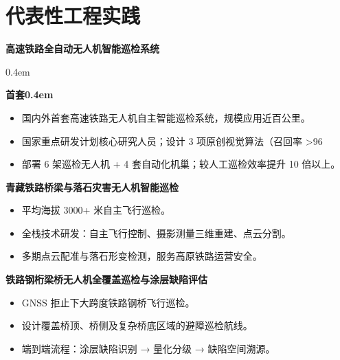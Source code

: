 \documentclass[10.5pt,a4paper]{ctexart}
\newcommand{\ambpill}[1]{\colorbox{amber}{\kern0.4em\strut\footnotesize\sffamily\bfseries\color{white}#1\kern0.4em}}
\begin{document}
\section{代表性工程实践}
\noindent\textbf{高速铁路全自动无人机智能巡检系统}\hspace{0.6em}\ambpill{首套}\par\vspace{0.2em}
\begin{itemize}[leftmargin=1.1em,label=\textcolor{amber}{$\bullet$},itemsep=1.5pt]
  \item 国内外首套高速铁路无人机自主智能巡检系统，规模应用近百公里。
  \item 国家重点研发计划核心研究人员；设计 3 项原创视觉算法（召回率 >96%
  \item 部署 6 架巡检无人机 + 4 套自动化机巢；较人工巡检效率提升 10 倍以上。
\end{itemize}
\vspace{0.5em}
\noindent\textbf{青藏铁路桥梁与落石灾害无人机智能巡检}\par\vspace{0.2em}
\begin{itemize}[leftmargin=1.1em,label=\textcolor{amber}{$\bullet$},itemsep=1.5pt]
  \item 平均海拔 3000+ 米自主飞行巡检。
  \item 全栈技术研发：自主飞行控制、摄影测量三维重建、点云分割。
  \item 多期点云配准与落石形变检测，服务高原铁路运营安全。
\end{itemize}
\vspace{0.5em}
\noindent\textbf{铁路钢桁梁桥无人机全覆盖巡检与涂层缺陷评估}\par\vspace{0.2em}
\begin{itemize}[leftmargin=1.1em,label=\textcolor{amber}{$\bullet$},itemsep=1.5pt]
  \item GNSS 拒止下大跨度铁路钢桥飞行巡检。
  \item 设计覆盖桥顶、桥侧及复杂桥底区域的避障巡检航线。
  \item 端到端流程：涂层缺陷识别 → 量化分级 → 缺陷空间溯源。
\end{itemize}

\end{document}
